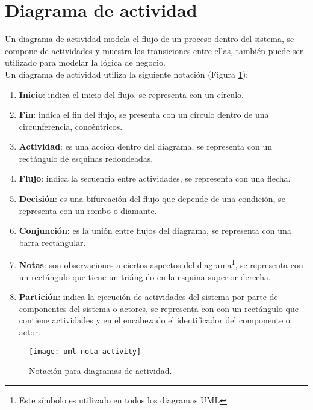 \section{Diagrama de actividad}\label{sec:uml-act}
Un diagrama de actividad modela el flujo de un proceso dentro del sistema, se compone de actividades y muestra las transiciones entre ellas, también puede ser utilizado para modelar la lógica de negocio\cite{UMLClassroom, SoftwareEngineeringUML}.\\
Un diagrama de actividad utiliza la siguiente notación\cite{UMLClassroom, SoftwareEngineeringUML} (Figura \ref{fig:uml-nota-activity}):
\begin{enumerate}
  \item \textbf{Inicio}: indica el inicio del flujo, se representa con un círculo.
  \item \textbf{Fin}: indica el fin del flujo, se presenta con un círculo dentro de una circunferencia, concéntricos.
  \item \textbf{Actividad}: es una acción dentro del diagrama, se representa con un rectángulo de esquinas redondeadas.
  \item \textbf{Flujo}: indica la secuencia entre actividades, se representa con una flecha.
  \item \textbf{Decisión}: es una bifurcación del flujo que depende de una condición, se representa con un rombo o diamante.
  \item \textbf{Conjunción}: es la unión entre flujos del diagrama, se representa con una barra rectangular.
  \item \textbf{Notas}: son observaciones a ciertos aspectos del diagrama\footnote{Este símbolo es utilizado en todos los diagramas UML}, se representa con un rectángulo que tiene un triángulo en la esquina superior derecha.
  \item \textbf{Partición}: indica la ejecución de actividades del sistema por parte de componentes del sistema o actores, se representa con con un rectángulo que contiene actividades y en el encabezado el identificador del componente o actor.
\end{enumerate}
\begin{figure}[h]
  \centering
  \texttt{[image: uml-nota-activity]}
  \caption{Notación para diagramas de actividad\cite{SoftwareEngineeringUML}.}
  \label{fig:uml-nota-activity}
\end{figure}
\pagebreak
